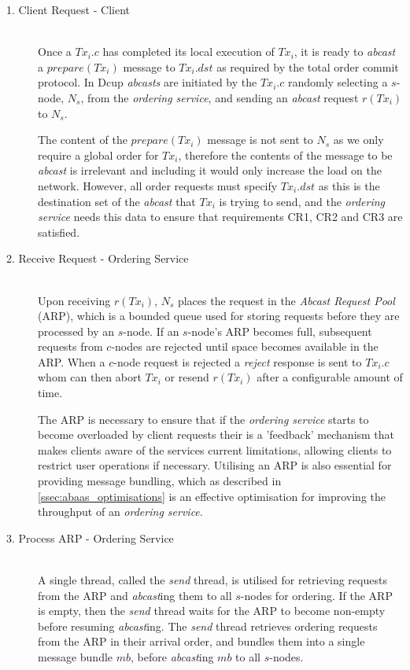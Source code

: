 	\begin{description}
		\item[1. Client Request - Client] \hfill \\
		Once a $Tx_i.c$ has completed its local execution of $Tx_i$, it is ready to \emph{abcast} a $prepare(Tx_i)$ message to $Tx_i.dst$ as required by the total order commit protocol.  In \textsf{Dcup} \emph{abcasts} are initiated by the $Tx_i.c$ randomly selecting a $s$-node, $N_s$, from the \emph{ordering service}, and sending an \emph{abcast} request $r(Tx_i)$ to $N_s$.  
		
		The content of the $prepare(Tx_i)$ message is not sent to $N_s$ as we only require a global order for $Tx_i$, therefore the contents of the message to be \emph{abcast} is irrelevant and including it would only increase the load on the network.  However, all order requests must specify $Tx_i.dst$ as this is the destination set of the \emph{abcast} that $Tx_i$ is trying to send, and the \emph{ordering service} needs this data to ensure that requirements CR1, CR2 and CR3 are satisfied.  
		
		\item[2. Receive Request - Ordering Service] \hfill \\
		Upon receiving $r(Tx_i)$, $N_s$ places the request in the \emph{Abcast Request Pool} (ARP), which is a bounded queue used for storing requests before they are processed by an $s$-node.  If an $s$-node's ARP becomes full, subsequent requests from $c$-nodes are rejected until space becomes available in the ARP.  When a $c$-node request is rejected a \emph{reject} response is sent to $Tx_i.c$ whom can then abort $Tx_i$ or resend $r(Tx_i)$ after a configurable amount of time.    
		
		The ARP is necessary to ensure that if the \emph{ordering service} starts to become overloaded by client requests their is a 'feedback' mechanism that makes clients aware of the services current limitations, allowing clients to restrict user operations if necessary.  Utilising an ARP is also essential for providing message bundling, which as described in \ref{ssec:abaas_optimisations} is an effective optimisation for improving the throughput of an \emph{ordering service}.  
		
		\item[3. Process ARP - Ordering Service] \hfill \\
		A single thread, called the \emph{send} thread, is utilised for retrieving requests from the ARP and \emph{abcast}ing them to all $s$-nodes for ordering.  If the ARP is empty, then the \emph{send} thread waits for the ARP to become non-empty before resuming \emph{abcast}ing.  The \emph{send} thread retrieves ordering requests from the ARP in their arrival order, and bundles them into a single message bundle $mb$, before \emph{abcast}ing $mb$ to all $s$-nodes.  
		

\end{description}
